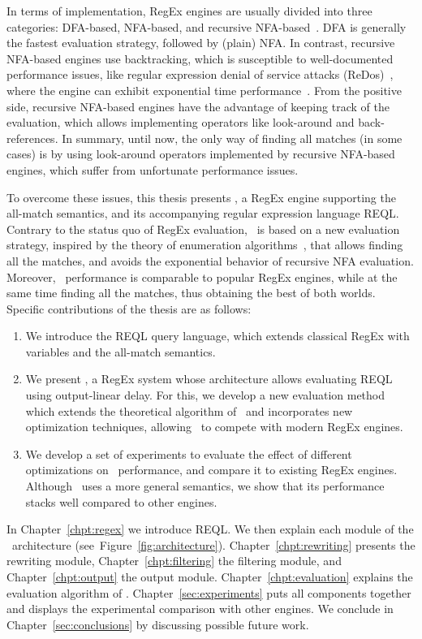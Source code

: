 In terms of implementation, RegEx engines are usually divided into three categories: DFA-based, NFA-based, and recursive NFA-based~\cite{cox2007regular}. DFA is generally the fastest evaluation strategy, followed by (plain) NFA. In contrast, recursive NFA-based engines use backtracking, which is susceptible to well-documented performance issues, like regular expression denial of service attacks (ReDos)~\cite{friedl2006mastering}, where the engine can exhibit exponential time performance~\cite{cox2007regular}. From the positive side, recursive NFA-based engines have the advantage of keeping track of the evaluation, which allows implementing operators like look-around and back-references.
In summary, until now, the only way of finding all matches (in some cases) is by using look-around operators implemented by recursive NFA-based engines, which suffer from unfortunate performance issues. 

To overcome these issues, this thesis presents \rematch, a RegEx engine supporting the all-match semantics, and its accompanying regular expression language REQL. Contrary to the status quo of RegEx evaluation, \rematch\ is based on a new evaluation strategy, inspired by the theory of enumeration algorithms~\cite{Segoufin13}, that allows finding all the matches, and avoids the exponential behavior of recursive NFA evaluation. Moreover, \rematch\ performance is comparable to popular RegEx engines, while at the same time finding all the matches, thus obtaining the best of both worlds. Specific contributions of the thesis are as follows:

\begin{enumerate}

\item  We introduce the REQL query language, which extends classical RegEx with variables and the all-match semantics.	

\item We present \rematch, a RegEx system whose architecture allows evaluating REQL using output-linear delay. For this, we develop a new evaluation method which extends the theoretical algorithm of~\cite{FlorenzanoRUVV20} and incorporates new optimization techniques, allowing \rematch\ to compete with modern RegEx engines. 

\item We develop a set of experiments to evaluate the effect of different optimizations on \rematch\ performance, and compare it to existing RegEx engines. Although \rematch\ uses a more general semantics, we show that its performance stacks well compared to other engines.
	
\end{enumerate}

In Chapter~\ref{chpt:regex} we introduce REQL. We then explain each module of the \rematch\ architecture (see~Figure~\ref{fig:architecture}). Chapter~\ref{chpt:rewriting} presents the rewriting module, Chapter~\ref{chpt:filtering} the filtering module, and Chapter~\ref{chpt:output} the output module. Chapter~\ref{chpt:evaluation} explains the evaluation algorithm of \rematch. Chapter~\ref{sec:experiments} puts all components together and displays the experimental comparison with other engines. We conclude in Chapter~\ref{sec:conclusions} by discussing possible future work. 

